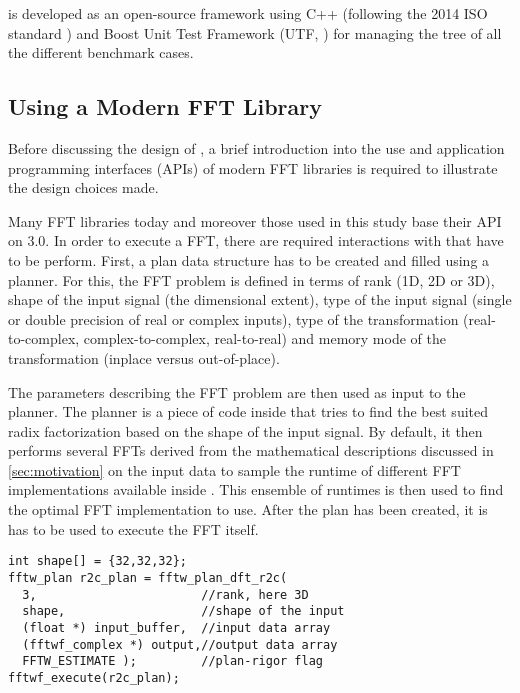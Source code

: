 
\gearshifft{} is developed as an open-source framework using C++ (following the 2014 ISO standard \cite{cpp14std}) and Boost Unit Test Framework (UTF, \cite{boost}) for managing the tree of all the different benchmark cases.

\subsection{Using a Modern FFT Library}
\label{ssec:modern_ffts}

Before discussing the design of \gearshifft{}, a brief introduction into the use and application programming interfaces (APIs) of modern FFT libraries is required to illustrate the design choices made.

Many FFT libraries today and moreover those used in this study base their API on \fftw{} $3.0$. In order to execute a FFT, there are required interactions with \fftw{} that have to be perform. First, a plan data structure has to be created and filled using a planner. For this, the FFT problem is defined in terms of rank (1D, 2D or 3D), shape of the input signal (the dimensional extent), type of the input signal (single or double precision of real or complex inputs), type of the transformation (real-to-complex, complex-to-complex, real-to-real) and memory mode of the transformation (inplace versus out-of-place). 

The parameters describing the FFT problem are then used as input to the planner. The planner is a piece of code inside \fftw{} that tries to find the best suited radix factorization based on the shape of the input signal. By default, it then performs several FFTs derived from the mathematical descriptions discussed in \cref{sec:motivation} on the input data to sample the runtime of different FFT implementations available inside \fftw{}. This ensemble of runtimes is then used to find the optimal FFT implementation to use. After the plan has been created, it is has to be used to execute the FFT itself.

\begin{lstlisting}[caption={Minimal usage example of the \fftw{} single precision real-to-complex planner API. Memory management is omitted.},label={lst:fftw_example}]
int shape[] = {32,32,32};
fftw_plan r2c_plan = fftw_plan_dft_r2c(
  3,                       //rank, here 3D
  shape,                   //shape of the input
  (float *) input_buffer,  //input data array
  (fftwf_complex *) output,//output data array
  FFTW_ESTIMATE );         //plan-rigor flag
fftwf_execute(r2c_plan);
\end{lstlisting}

